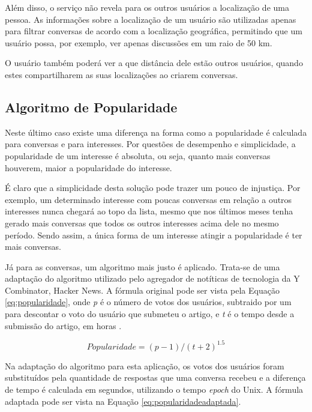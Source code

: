 \documentclass[diss]{template/setrem}
\begin{document}
Além disso, o serviço não revela para os outros usuários a localização de uma pessoa. As informações sobre a localização de um usuário são utilizadas apenas para filtrar conversas de acordo com a localização geográfica, permitindo que um usuário possa, por exemplo, ver apenas discussões em um raio de 50 km.

O usuário também poderá ver a que distância dele estão outros usuários, quando estes compartilharem as suas localizações ao criarem conversas.

\subsection{Algoritmo de Popularidade}
\label{subsec:algopopularidade}
Neste último caso existe uma diferença na forma como a popularidade é calculada para conversas e para interesses. Por questões de desempenho e simplicidade, a popularidade de um interesse é absoluta, ou seja, quanto mais conversas houverem, maior a popularidade do interesse.

É claro que a simplicidade desta solução pode trazer um pouco de injustiça. Por exemplo, um determinado interesse com poucas conversas em relação a outros interesses nunca chegará ao topo da lista, mesmo que nos últimos meses tenha gerado mais conversas que todos os outros interesses acima dele no mesmo período. Sendo assim, a única forma de um interesse atingir a popularidade é ter mais conversas.

Já para as conversas, um algoritmo mais justo é aplicado. Trata-se de uma adaptação do algoritmo utilizado pelo agregador de notíticas de tecnologia da Y Combinator, Hacker News. A fórmula original pode ser vista pela Equação \ref{eq:popularidade}, onde \emph{p} é o número de votos dos usuários, subtraido por um para descontar o voto do usuário que submeteu o artigo, e \emph{t} é o tempo desde a submissão do artigo, em horas \citep{Linkibol2010}.

\begin{equation}
\label{eq:popularidade}
Popularidade = (p - 1)/(t +2)^{1.5}
\end{equation}

Na adaptação do algoritmo para esta aplicação, os votos dos usuários foram substituídos pela quantidade de respostas que uma conversa recebeu e a diferença de tempo é calculada em segundos, utilizando o tempo \emph{epoch} do Unix. A fórmula adaptada pode ser vista na Equação \ref{eq:popularidadeadaptada}.
\end{document}
